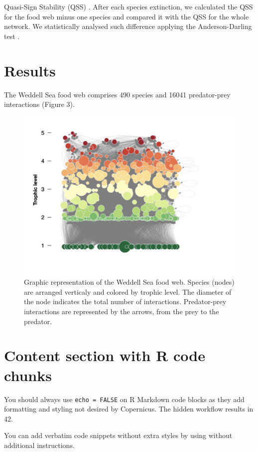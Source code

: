 \documentclass[gc, manuscript]{copernicus}
\begin{document}
Quasi-Sign Stability (QSS) \citep{Allesina2008}. After each species
extinction, we calculated the QSS for the food web minus one species and
compared it with the QSS for the whole network. We statistically
analysed such difference applying the Anderson-Darling test
\citep{Scholz1987}.

\section{Results}

The Weddell Sea food web comprises 490 species and 16041 predator-prey
interactions (Figure 3).

\begin{figure}
\includegraphics[width=12cm]{WeddellSea_net} \caption{Graphic representation of the Weddell Sea food web. Species (nodes) are arranged verticaly and colored by trophic level. The diameter of the node indicates the total number of interactions. Predator-prey interactions are represented by the arrows, from the prey to the predator.}\label{fig:unnamed-chunk-3}
\end{figure}

\section{Content section with R code chunks}

You should always use \texttt{echo\ =\ FALSE} on R Markdown code blocks
as they add formatting and styling not desired by Copernicus. The hidden
workflow results in 42.

You can add verbatim code snippets without extra styles by using
\texttt{\textasciigrave{}\textasciigrave{}\textasciigrave{}} without
additional instructions.
\end{document}
